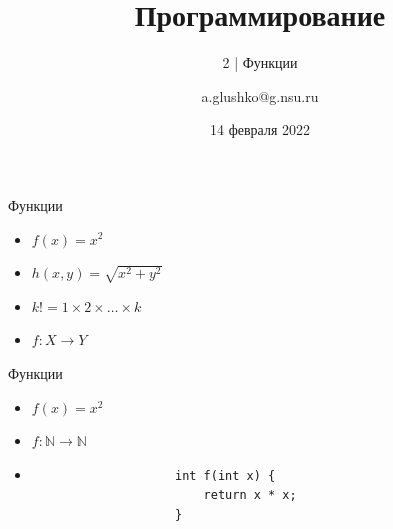 \documentclass[aspectratio=169,14pt]{beamer}
\title{Программирование}
\subtitle{2 | Функции}
\author{a.glushko@g.nsu.ru}
\date{14 февраля 2022}
\begin{document}
    \begin{frame}
        \titlepage
    \end{frame}

    \begin{frame}{Функции}
        \begin{itemize}
            \item $f(x) = x^2$
            \item $h(x, y) = \sqrt{x^2 + y^2}$
            \item $k! = 1 \times 2 \times \dots \times k$
            \item<2> $f: X \rightarrow Y$
        \end{itemize}
    \end{frame}

    \begin{frame}[fragile]{Функции}
        \begin{itemize}
            \item $f(x) = x^2$
            \item $f: \mathbb{N} \rightarrow \mathbb{N}$
            \item<2->
                \begin{verbatim}
                    int f(int x) {
                        return x * x;
                    }
                \end{verbatim}
        \end{itemize}
    \end{frame}
\end{document}
